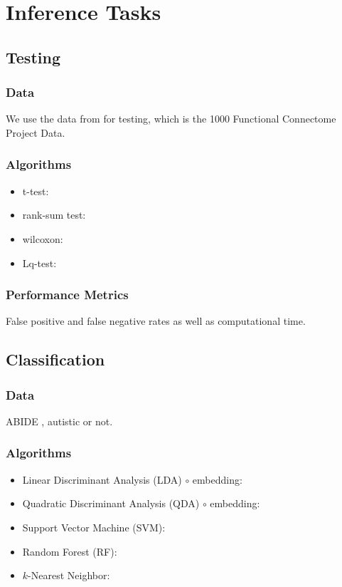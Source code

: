 \documentclass[12pt]{article}
\begin{document}
\section{Inference Tasks}
\subsection{Testing}


\subsubsection{Data}

We use the data from \cite{Eklund2012a} for testing, which is the 1000 Functional Connectome Project Data.

\subsubsection{Algorithms}

\begin{itemize} \itemsep0pt
	\item t-test:
	\item rank-sum test:
	\item wilcoxon:
	\item Lq-test: 
\end{itemize}


\subsubsection{Performance Metrics}


False positive and false negative rates as well as computational time.


\subsection{Classification}

\subsubsection{Data}

ABIDE \cite{DiMartino2013}, autistic or not.

\subsubsection{Algorithms}

\begin{itemize} \itemsep0pt
	\item Linear Discriminant Analysis (LDA) $\circ$ embedding:
	\item Quadratic Discriminant Analysis (QDA) $\circ$ embedding:
	\item Support Vector Machine (SVM):
	\item Random Forest (RF):
	\item $k$-Nearest Neighbor: 
\end{itemize}
\end{document}
